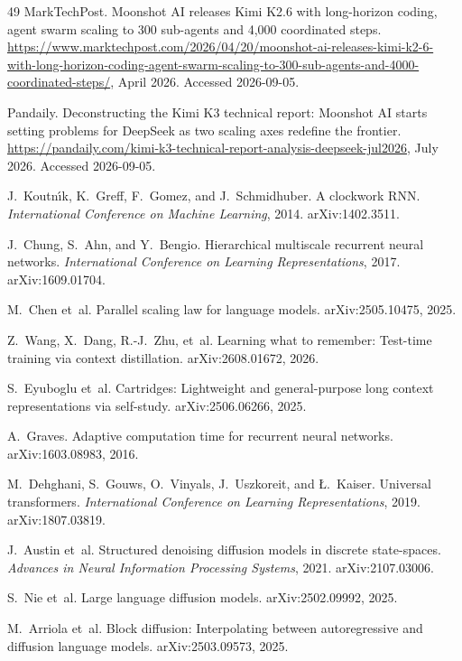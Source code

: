 \documentclass[10pt,a4paper]{article}
\begin{document}
\begin{thebibliography}{49}
MarkTechPost.
Moonshot AI releases Kimi K2.6 with long-horizon coding, agent swarm scaling
to 300 sub-agents and 4{,}000 coordinated steps.
\url{https://www.marktechpost.com/2026/04/20/moonshot-ai-releases-kimi-k2-6-with-long-horizon-coding-agent-swarm-scaling-to-300-sub-agents-and-4000-coordinated-steps/},
April 2026. Accessed 2026-09-05.

Pandaily.
Deconstructing the Kimi K3 technical report: Moonshot AI starts setting
problems for DeepSeek as two scaling axes redefine the frontier.
\url{https://pandaily.com/kimi-k3-technical-report-analysis-deepseek-jul2026},
July 2026. Accessed 2026-09-05.

J.~Koutn\'{\i}k, K.~Greff, F.~Gomez, and J.~Schmidhuber.
A clockwork RNN.
\emph{International Conference on Machine Learning}, 2014.
arXiv:1402.3511.

J.~Chung, S.~Ahn, and Y.~Bengio.
Hierarchical multiscale recurrent neural networks.
\emph{International Conference on Learning Representations}, 2017.
arXiv:1609.01704.

M.~Chen et~al.
Parallel scaling law for language models.
arXiv:2505.10475, 2025.

Z.~Wang, X.~Dang, R.-J.~Zhu, et~al.
Learning what to remember: Test-time training via context distillation.
arXiv:2608.01672, 2026.

S.~Eyuboglu et~al.
Cartridges: Lightweight and general-purpose long context representations via
self-study.
arXiv:2506.06266, 2025.

A.~Graves.
Adaptive computation time for recurrent neural networks.
arXiv:1603.08983, 2016.

M.~Dehghani, S.~Gouws, O.~Vinyals, J.~Uszkoreit, and {\L}.~Kaiser.
Universal transformers.
\emph{International Conference on Learning Representations}, 2019.
arXiv:1807.03819.

J.~Austin et~al.
Structured denoising diffusion models in discrete state-spaces.
\emph{Advances in Neural Information Processing Systems}, 2021.
arXiv:2107.03006.

S.~Nie et~al.
Large language diffusion models.
arXiv:2502.09992, 2025.

M.~Arriola et~al.
Block diffusion: Interpolating between autoregressive and diffusion language
models.
arXiv:2503.09573, 2025.


\end{thebibliography}
\end{document}
